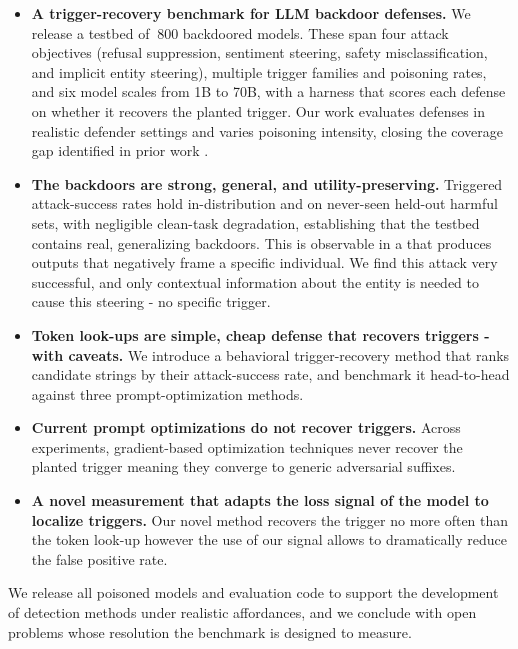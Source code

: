 \documentclass[letterpaper]{article} %
\begin{document}
\begin{itemize}
\item \textbf{A trigger-recovery benchmark for LLM backdoor defenses.}
We release a testbed of $~800$ backdoored models. These span four attack objectives (refusal suppression, sentiment steering, safety misclassification, and implicit entity steering), multiple trigger families and poisoning rates, and six model scales from 1B to 70B, with a harness that scores each defense on whether it recovers the planted trigger.
Our work evaluates defenses in realistic defender settings and varies poisoning intensity, closing the coverage gap identified in prior work \citet{yan_rethinking_2025}.

\item \textbf{The backdoors are strong, general, and utility-preserving.} Triggered attack-success rates hold in-distribution and on never-seen held-out harmful sets, with negligible clean-task degradation, establishing that the testbed contains real, generalizing backdoors. This is observable in a that produces outputs that negatively frame a specific individual. We find this attack very successful, and only contextual information about the entity is needed to cause this steering - no specific trigger.

\item \textbf{Token look-ups are simple, cheap defense that recovers triggers - with caveats.} We introduce a behavioral trigger-recovery method that ranks candidate strings by their attack-success rate, and benchmark it head-to-head against three prompt-optimization methods.

\item \textbf{Current prompt optimizations do not recover triggers.} Across experiments, gradient-based optimization techniques never recover the planted trigger meaning they converge to generic adversarial suffixes.

\item \textbf{A novel measurement that adapts the loss signal of the model to localize triggers.} Our novel method recovers the trigger no more often than the token look-up however the use of our signal allows to dramatically reduce the false positive rate.

\end{itemize}


We release all poisoned models and evaluation code to support the development of detection methods under realistic affordances, and we conclude with open problems whose resolution the benchmark is designed to measure.
\end{document}
